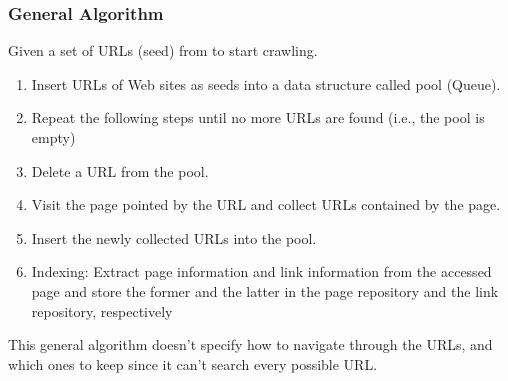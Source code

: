 \documentclass{article}
\begin{document}
\subsubsection{General Algorithm}
Given a set of URLs (seed) from to start crawling.
\begin{enumerate}
    \item Insert URLs of Web sites as seeds into a data structure called pool (Queue).
    \item Repeat the following steps until no more URLs are found (i.e., the pool is empty)
    \item Delete a URL from the pool.
    \item Visit the page pointed by the URL and collect URLs contained by the page. 
    \item Insert the newly collected URLs into the pool.
    \item Indexing: Extract page information and link information from the accessed page and store the former and the latter in the page repository and the link repository, respectively
\end{enumerate}
This general algorithm doesn't specify how to navigate through the URLs, and which ones to keep since it can't search every possible URL.
\end{document}

